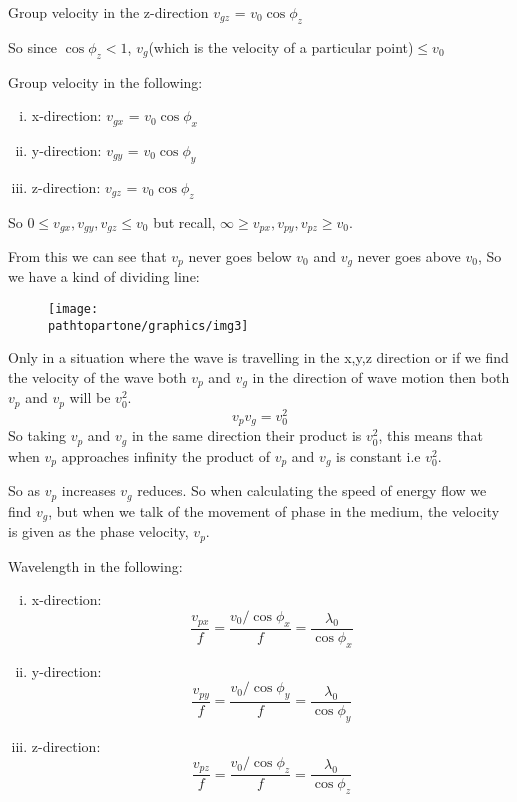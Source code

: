 \begin{center}
Group velocity in the z-direction
$v_{gz}$ = $v_0\cos\phi_{z}$
\end{center}
So since $\cos\phi_{z} < 1$, $v_g$(which is the velocity of a particular point)$\leq v_0$


Group velocity in the following:
\begin{enumerate}[(i)]
\item x-direction:	$v_{gx}$ = $v_0\cos\phi_{x}$
\item y-direction: 	$v_{gy}$ = $v_0\cos\phi_{y}$
\item z-direction:	$v_{gz}$ = $v_0\cos\phi_{z}$
\end{enumerate}

So $0\leq v_{gx},v_{gy},v_{gz} \leq v_0$ but recall, $\infty\geq v_{px},v_{py},v_{pz} \geq v_0$.

From this we can see that $v_p$ never goes below $v_0$ and $v_g$ never goes above $v_0$,
So we have a kind of dividing line:
\begin{figure}[h]
\centering
\texttt{[image: \\pathtopartone/graphics/img3]}
\caption{}
\end{figure}

Only in a situation where the wave is travelling in the x,y,z direction or if we find the velocity of the wave both $v_p$ and $v_g$ in the direction of wave motion then both $v_p$ and $v_p$ will be $v_{0}^2$.
\begin{equation}
v_p v_g = v_{0}^2
\end{equation}
So taking $v_p$ and $v_g$ in the same direction their product is $v_{0}^2$, this means that when $v_p$ approaches infinity the product of $v_p$ and $v_g$ is constant i.e $v_{0}^2$.

So as $v_p$ increases $v_g$ reduces. So when calculating the speed of energy flow we find $v_g$, but when we talk of the movement of phase in the medium, the velocity is given as the phase velocity,  $v_p$.

Wavelength in the following:
\begin{enumerate}[(i)]
\item x-direction: 
\begin{dmath*}	
\frac{v_{px}}{f} = \frac{v_0/\cos\phi_{x}}{f}
= \frac{\lambda_0}{\cos\phi_{x}}
\end{dmath*}
\item y-direction: 	
\begin{dmath*}
\frac{v_{py}}{f} = \frac{v_0/\cos\phi_{y}}{f}
= \frac{\lambda_0}{\cos\phi_{y}}
\end{dmath*}
\item z-direction: 	
\begin{dmath*}
\frac{v_{pz}}{f} = \frac{v_0/\cos\phi_{z}}{f}
= \frac{\lambda_0}{\cos\phi_{z}}
\end{dmath*}
\end{enumerate}
